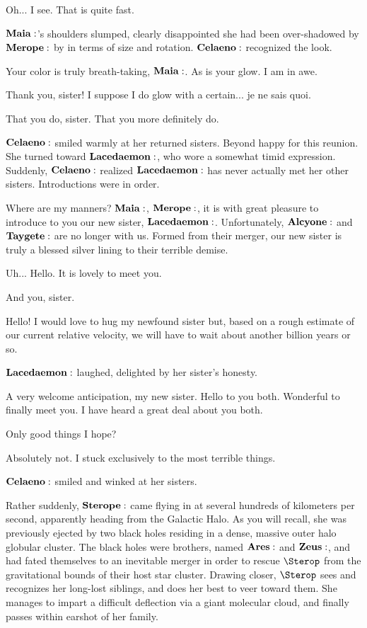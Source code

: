 \Celaeno Oh... I see.  That is quite fast.

$\Maia$'s shoulders slumped, clearly disappointed she had been over-shadowed by $\Merope$ by in terms of size and rotation.  $\Celaeno$ recognized the look.

\Celaeno Your color is truly breath-taking, $\Maia$.  As is your glow.  I am in awe.

\Maia Thank you, sister!  I suppose I do glow with a certain... je ne sais quoi.

\Celaeno That you do, sister.  That you more definitely do.

$\Celaeno$ smiled warmly at her returned sisters.  Beyond happy for this reunion.  She turned toward $\Lacedaemon$, who wore a somewhat timid expression.  Suddenly, $\Celaeno$ realized $\Lacedaemon$ has never actually met her other sisters.  Introductions were in order.

\Celaeno  Where are my manners?  $\Maia$, $\Merope$, it is with great pleasure to introduce to you our new sister, $\Lacedaemon$.  Unfortunately, $\Alcyone$ and $\Taygete$ are no longer with us.  Formed from their merger, our new sister is truly a blessed silver lining to their terrible demise.

\Lacedaemon Uh... Hello.  It is lovely to meet you.

\Merope And you, sister.

\Maia Hello!  I would love to hug my newfound sister but, based on a rough estimate of our current relative velocity, we will have to wait about another billion years or so.

$\Lacedaemon$ laughed, delighted by her sister's honesty.

\Lacedaemon A very welcome anticipation, my new sister.  Hello to you both.  Wonderful to finally meet you.  I have heard a great deal about you both.

\Merope Only good things I hope?

\Celaeno Absolutely not.  I stuck exclusively to the most terrible things.

$\Celaeno$ smiled and winked at her sisters.

Rather suddenly, $\Sterope$ came flying in at several hundreds of kilometers per second, apparently heading from the Galactic Halo.  As you will recall, she was previously ejected by two black holes residing in a dense, massive outer halo globular cluster.  The black holes were brothers, named $\Ares$ and $\Zeus$, and had fated themselves to an inevitable merger in order to rescue $\Sterop$ from the gravitational bounds of their host star cluster.  Drawing closer, $\Sterop$ sees and recognizes her long-lost siblings, and does her best to veer toward them.  She manages to impart a difficult deflection via a giant molecular cloud, and finally passes within earshot of her family.  

